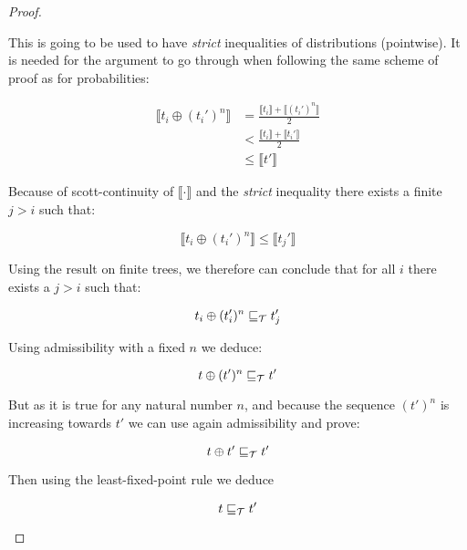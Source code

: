 \begin{proof}
\begin{enumerate}
            This is going to be used to have \emph{strict}
            inequalities of distributions (pointwise). 
            It is needed for the argument to go through
            when following the same scheme of proof as 
            for probabilities:

            \begin{align*}
                \llbracket t_i \oplus (t_i')^n \rrbracket 
                &= \frac{\llbracket t_i \rrbracket + \llbracket (t_i')^n
                \rrbracket}{2} \\
                &< \frac{\llbracket t_i \rrbracket + \llbracket t_i'
                \rrbracket}{2} \\
                &\leq \llbracket t' \rrbracket
            \end{align*}

            Because of scott-continuity of $\llbracket \cdot \rrbracket$ 
            and the \emph{strict} inequality there exists a finite $j>i$
            such that:
    
            \begin{equation*}
                \llbracket t_i \oplus (t_i')^n \rrbracket 
                \leq \llbracket t_j' \rrbracket
            \end{equation*}
            
            Using the result on finite trees, we therefore can 
            conclude that for all $i$ there exists a $j > i$ 
            such that:

            \begin{equation*}
                t_i \oplus (t_i')^n \sqsubseteq_{\mathcal{T}} t_j'
            \end{equation*}

            Using admissibility with a fixed $n$ we deduce:

            \begin{equation*}
                t \oplus (t')^n \sqsubseteq_{\mathcal{T}} t'
            \end{equation*}

            But as it is true for any natural number $n$, and 
            because the sequence $(t')^n$ is increasing 
            towards $t'$ we can use again admissibility and 
            prove:

            \begin{equation*}
                t \oplus t' \sqsubseteq_\mathcal{T} t' 
            \end{equation*}

            Then using the least-fixed-point rule we deduce 

            \begin{equation*}
                t \sqsubseteq_{\mathcal{T}} t'
            \end{equation*}
    \end{enumerate}
\end{proof}

